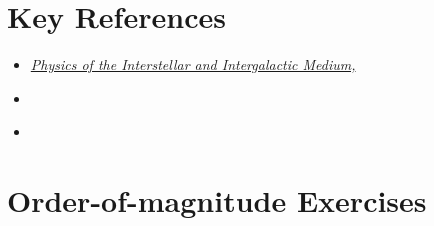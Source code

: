 \section{Key References}

\begin{itemize}
  \item
    \href{http://}
    {\it Physics of the Interstellar and Intergalactic Medium,
      \citet{draine07a}}
\item \citet{bolatto13a}
\item \citet{kalberla09a}
\end{itemize}

\section{Order-of-magnitude Exercises}

